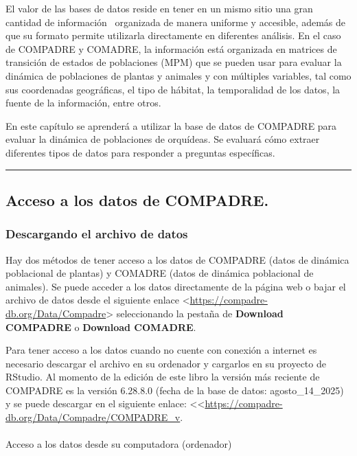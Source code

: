 \documentclass[
  12pt,
  letterpaper,
]{book}
\makeatletter
\let\oldparagraph\paragraph
\renewcommand{\paragraph}{
    \@ifstar
      \xxxParagraphStar
      \xxxParagraphNoStar
  }
\newcommand{\xxxParagraphStar}[1]{\oldparagraph*{#1}\mbox{}}
\newcommand{\xxxParagraphNoStar}[1]{\oldparagraph{#1}\mbox{}}
\makeatother
\begin{document}
El valor de las bases de datos reside en tener en un mismo sitio una
gran cantidad de información ~organizada de manera uniforme y accesible,
además de que su formato permite utilizarla directamente en diferentes
análisis. En el caso de COMPADRE y COMADRE, la información está
organizada en matrices de transición de estados de poblaciones (MPM) que
se pueden usar para evaluar la dinámica de poblaciones de plantas y
animales y con múltiples variables, tal como sus coordenadas
geográficas, el tipo de hábitat, la temporalidad de los datos, la fuente
de la información, entre otros.

En este capítulo se aprenderá a utilizar la base de datos de COMPADRE
para evaluar la dinámica de poblaciones de orquídeas. Se evaluará cómo
extraer diferentes tipos de datos para responder a preguntas
específicas.

\begin{center}\rule{0.5\linewidth}{0.5pt}\end{center}

\subsection{Acceso a los datos de
COMPADRE.}\label{acceso-a-los-datos-de-compadre.}

\subsubsection{Descargando el archivo de
datos}\label{descargando-el-archivo-de-datos}

Hay dos métodos de tener acceso a los datos de COMPADRE (datos de
dinámica poblacional de plantas) y COMADRE (datos de dinámica
poblacional de animales). Se puede acceder a los datos directamente de
la página web o bajar el archivo de datos desde el siguiente enlace
\textless{}\url{https://compadre-db.org/Data/Compadre}\textgreater{}
seleccionando la pestaña de \textbf{Download COMPADRE} o
\textbf{Download COMADRE}.

Para tener acceso a los datos cuando no cuente con conexión a internet
es necesario descargar el archivo en su ordenador y cargarlos en su
proyecto de RStudio. Al momento de la edición de este libro la versión
más reciente de COMPADRE es la versión 6.28.8.0 (fecha de la base de
datos: agosto\_14\_2025) y se puede descargar en el siguiente enlace:
\textless\textless{}\url{https://compadre-db.org/Data/Compadre/COMPADRE_v}.

\paragraph{Acceso a los datos desde su computadora
(ordenador)}\label{acceso-a-los-datos-desde-su-computadora-ordenador}
\end{document}
